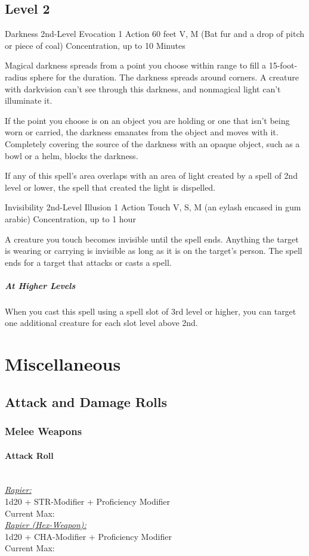 {\subsection*{Level 2}

\DndSpellHeader
	{Darkness}
	{2nd-Level Evocation}
	{1 Action}
	{60 feet}
	{V, M (Bat fur and a drop of pitch or piece of coal)}
	{Concentration, up to 10 Minutes}
	
Magical darkness spreads from a point you choose within range to fill a 15-foot-radius sphere for the duration. The darkness spreads around corners. A creature with darkvision can't see through this darkness, and nonmagical light can't illuminate it.

If the point you choose is on an object you are holding or one that isn't being worn or carried, the darkness emanates from the object and moves with it. Completely covering the source of the darkness with an opaque object, such as a bowl or a helm, blocks the darkness.

If any of this spell's area overlaps with an area of light created by a spell of 2nd level or lower, the spell that created the light is dispelled.
	
\DndSpellHeader
	{Invisibility}
	{2nd-Level Illusion}
	{1 Action}
	{Touch}
	{V, S, M (an eylash encased in gum arabic)}
	{Concentration, up to 1 hour}

A creature you touch becomes invisible until the spell ends. Anything the target is wearing or carrying is invisible as long as it is on the target’s person. The spell ends for a target that attacks or casts a spell.

\subparagraph*{At Higher Levels} When you cast this spell using a spell slot of 3rd level or higher, you can target one additional creature for each slot level above 2nd.

\vfill\eject
\section*{Miscellaneous}
\subsection*{Attack and Damage Rolls}
\subsubsection*{Melee Weapons}
\paragraph*{Attack Roll}\hfill\\
\underline{\textit{Rapier:}}\\
1d20 + STR-Modifier + Proficiency Modifier\\
\indent Current Max: \\
\underline{\textit{Rapier (Hex-Weapon):}}\\
1d20 + CHA-Modifier + Proficiency Modifier\\
\indent Current Max: 
}
